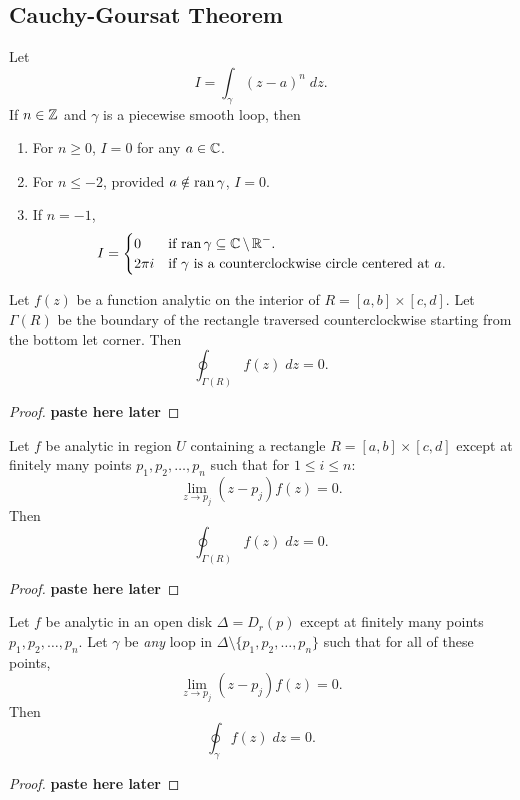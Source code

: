 \documentclass[notes]{subfile}
\begin{document}
\subsection{Cauchy-Goursat Theorem}
Let 
\[ I = \int_{\gamma} (z-a)^n \; dz. \]
If $n \in \operatorname{\mathbb{Z}}$ and $\gamma$  is a piecewise smooth loop, then
\begin{enumerate}
    \item For $n \ge 0$, $I = 0$ for any $a \in \operatorname{\mathbb{C}}$.
    \item For $n \le -2$, provided $a \notin \operatorname{ran}{\gamma}$,
        $I = 0$.
    \item If $n = -1$,
        \[ I = \begin{cases}
                0 & \text{if $\operatorname{ran}{\gamma} \subseteq \operatorname{\mathbb{C}} \setminus \operatorname{\mathbb{R}}^-$.} \\
                2\pi i & \text{if $\gamma$ is a counterclockwise circle 
                centered at $a$.}
            \end{cases}
        \]
       
\end{enumerate}

\begin{theorem}
    Let $f(z)$ be a function analytic on the interior of 
    $R = [a,b] \times [c,d]$.
    Let $\Gamma(R)$ be the boundary of the rectangle traversed 
    counterclockwise starting from the bottom let corner.
    Then
    \[ \oint_{\Gamma(R)} f(z) \; dz = 0. \]
\end{theorem}

\begin{proof}
    \textbf{paste here later}
\end{proof}

\begin{theorem} 
    Let $f$ be analytic in region $U$ containing a rectangle
    $R = [a,b] \times [c,d]$ except at finitely many points
    $p_1, p_2, \ldots, p_n$ such that for $1 \le i \le n$:
    \[ \lim_{z \to p_j} (z-p_j) f(z) = 0.\]
    Then
    \[ \oint_{\Gamma(R)} f(z) \; dz = 0. \]
\end{theorem}

\begin{proof}
    \textbf{paste here later}
\end{proof}

\begin{theorem}
    Let $f$ be analytic in an open disk $\Delta = D_r(p)$
    except at finitely many points $p_1, p_2, \ldots, p_n$.
    Let $\gamma$ be \textit{any} loop in $\Delta \setminus 
    \{ p_1, p_2, \ldots, p_n \}$ such that for all of these points,
    \[ \lim_{z \to p_j} (z-p_j)f(z) = 0.\]
    Then
    \[ \oint_{\gamma} f(z) \; dz = 0. \]
\end{theorem}

\begin{proof}
    \textbf{paste here later}
\end{proof}
\end{document}
